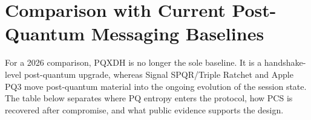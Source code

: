 \documentclass[preprint,12pt]{elsarticle}
\theoremstyle{definition}
\newcommand{\tech}[1]{\textnormal{#1}}
\newcommand{\SPQR}{\tech{SPQR}}
\newcommand{\PQThree}{\tech{PQ3}}
\begin{document}
\section{Comparison with Current Post-Quantum Messaging Baselines}\label{sec:comparison}

For a 2026 comparison, PQXDH is no longer the sole baseline. It is a
handshake-level post-quantum upgrade, whereas Signal \SPQR{}/Triple Ratchet
and Apple \PQThree{} move post-quantum material into the ongoing evolution of
the session state. The table below separates where PQ entropy enters the
protocol, how PCS is recovered after compromise, and what public evidence
supports the design.
\end{document}
